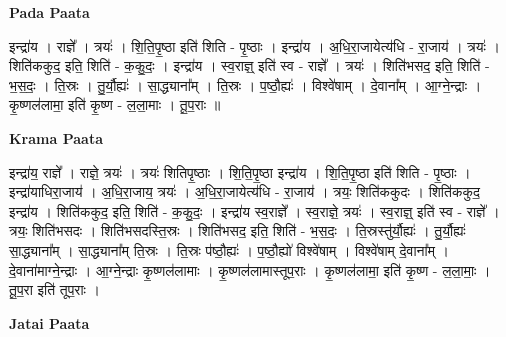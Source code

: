 \documentclass[17pt]{extarticle}
\begin{document}
\textbf{Pada Paata} \newline

इन्द्रा॑य । राज्ञे᳚ । त्रयः॑ । शि॒ति॒पृ॒ष्ठा इति॑ शिति - पृ॒ष्ठाः । इन्द्रा॑य । अ॒धि॒रा॒जायेत्य॑धि - रा॒जाय॑ । त्रयः॑ । शिति॑ककुद॒ इति॒ शिति॑ - क॒कु॒दः॒ । इन्द्रा॑य । स्व॒राज्ञ्॒ इति॑ स्व - राज्ञे᳚ । त्रयः॑ । शिति॑भसद॒ इति॒ शिति॑ - भ॒स॒दः॒ । ति॒स्रः । तु॒र्यौ॒ह्यः॑ । सा॒द्ध्याना᳚म् । ति॒स्रः । प॒ष्ठौ॒ह्यः॑ । विश्वे॑षाम् । दे॒वाना᳚म् । आ॒ग्ने॒न्द्राः । कृ॒ष्णल॑लामा॒ इति॑ कृ॒ष्ण - ल॒ला॒माः । तू॒प॒राः ॥  \newline


\textbf{Krama Paata} \newline

इन्द्रा॑य॒ राज्ञे᳚ । राज्ञे॒ त्रयः॑ । त्रयः॑ शितिपृ॒ष्ठाः । शि॒ति॒पृ॒ष्ठा इन्द्रा॑य । शि॒ति॒पृ॒ष्ठा इति॑ शिति - पृ॒ष्ठाः । इन्द्रा॑याधिरा॒जाय॑ । अ॒धि॒रा॒जाय॒ त्रयः॑ । अ॒धि॒रा॒जायेत्य॑धि - रा॒जाय॑ । त्रयः॒ शिति॑ककुदः । शिति॑ककुद॒ इन्द्रा॑य । शिति॑ककुद॒ इति॒ शिति॑ - क॒कु॒दः॒ । इन्द्रा॑य स्व॒राज्ञे᳚ । स्व॒राज्ञे॒ त्रयः॑ । स्व॒राज्ञ्॒ इति॑ स्व - राज्ञे᳚ । त्रयः॒ शिति॑भसदः । शिति॑भसदस्ति॒स्रः । शिति॑भसद॒ इति॒ शिति॑ - भ॒स॒दः॒ । ति॒स्रस्तु॑र्यौ॒ह्यः॑ । तु॒र्यौ॒ह्यः॑ सा॒द्ध्याना᳚म् । सा॒द्ध्याना᳚म् ति॒स्रः । ति॒स्रः प॑ष्ठौ॒ह्यः॑ । प॒ष्ठौ॒ह्यो॑ विश्वे॑षाम् । विश्वे॑षाम् दे॒वाना᳚म् । दे॒वाना॑माग्ने॒न्द्राः । आ॒ग्ने॒न्द्राः कृ॒ष्णल॑लामाः । कृ॒ष्णल॑लामास्तूप॒राः । कृ॒ष्णल॑लामा॒ इति॑ कृ॒ष्ण - ल॒ला॒माः॒ । तू॒प॒रा इति॑ तूप॒राः । \newline

\textbf{Jatai Paata} \newline
\end{document}
